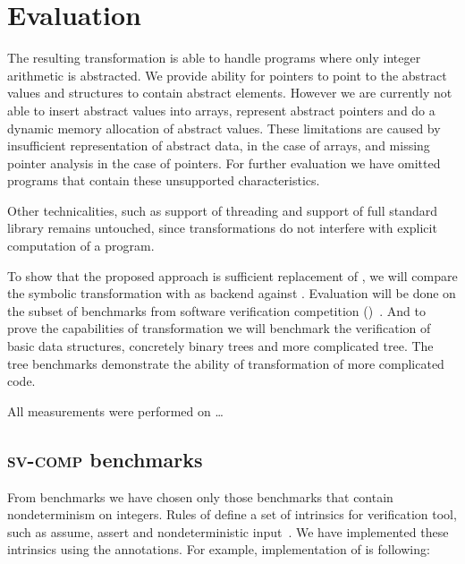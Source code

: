 \chapter{Evaluation}\label{ch:results}

The resulting transformation is able to handle programs where only integer
arithmetic is abstracted. We provide ability for pointers to point to the
abstract values and structures to contain abstract elements. However we are
currently not able to insert abstract values into arrays, represent abstract
pointers and do a dynamic memory allocation of abstract values. These
limitations are caused by insufficient representation of abstract data, in the
case of arrays, and missing pointer analysis in the case of pointers. For
further evaluation we have omitted programs that contain these unsupported
characteristics.

Other technicalities, such as support of threading and support of full \Cpp{}
standard library remains untouched, since transformations do not interfere with
explicit computation of a program.

To show that the proposed approach is sufficient replacement of \SymDIVINE, we
will compare the symbolic transformation with \DIVINE as backend against
\SymDIVINE. Evaluation will be done on the subset of benchmarks from software
verification competition (\svcomp)~\cite{Beyer17}.
And to prove the capabilities of transformation we will benchmark the
verification of basic data structures, concretely binary trees and more
complicated \AVL tree. The \AVL tree benchmarks demonstrate the ability of
transformation of more complicated code.

All measurements were performed on \dots
{}

\section{\textsc{sv-comp} benchmarks}

From \svcomp benchmarks we have chosen only those benchmarks that contain
nondeterminism on integers. Rules of \svcomp define a set of intrinsics for
verification tool, such as assume, assert and nondeterministic
input~\cite{svcomp}. We have implemented these intrinsics using the annotations.
For example, implementation of  is following:

